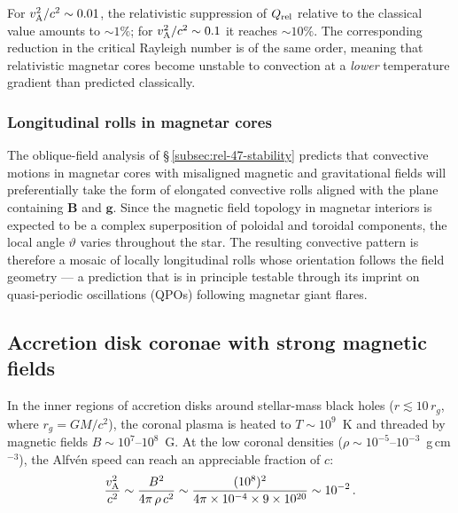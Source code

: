 For $v_{\mathrm{A}}^{2}/c^{2} \sim 0.01$, the relativistic suppression of $Q_{\mathrm{rel}}$
relative to the classical value amounts to $\sim 1\%$; for
$v_{\mathrm{A}}^{2}/c^{2} \sim 0.1$ it reaches $\sim 10\%$.  The corresponding
reduction in the critical Rayleigh number is of the same order, meaning
that relativistic magnetar cores become unstable to convection at a
\emph{lower} temperature gradient than predicted classically.

\subsubsection{Longitudinal rolls in magnetar cores}

The oblique-field analysis of \S\,\ref{subsec:rel-47-stability}
predicts that convective motions in magnetar cores with misaligned
magnetic and gravitational fields will preferentially take the form of
elongated convective rolls aligned with the plane containing
$\mathbf{B}$ and $\mathbf{g}$.  Since the magnetic field topology in
magnetar interiors is expected to be a complex superposition of poloidal
and toroidal components, the local angle $\vartheta$ varies throughout
the star.  The resulting convective pattern is therefore a mosaic of
locally longitudinal rolls whose orientation follows the field geometry
--- a prediction that is in principle testable through its imprint on
quasi-periodic oscillations (QPOs) following magnetar giant flares.

\subsection{Accretion disk coronae with strong magnetic fields}
\label{subsec:rel-48-accretion}

In the inner regions of accretion disks around stellar-mass black holes
($r \lesssim 10\,r_{g}$, where $r_{g} = GM/c^{2}$), the coronal plasma
is heated to $T \sim 10^{9}$~K and threaded by magnetic fields
$B \sim 10^{7}$--$10^{8}$~G.  At the low coronal densities
($\rho \sim 10^{-5}$--$10^{-3}$~g\,cm$^{-3}$), the Alfv\'en speed can
reach an appreciable fraction of $c$:
\begin{equation}
  \frac{v_{\mathrm{A}}^{2}}{c^{2}}
  \sim \frac{B^{2}}{4\pi\,\rho\,c^{2}}
  \sim \frac{(10^{8})^{2}}{4\pi \times 10^{-4} \times 9\times 10^{20}}
  \sim 10^{-2}\,.
  \label{eq:rel-vA-corona}
\end{equation}

